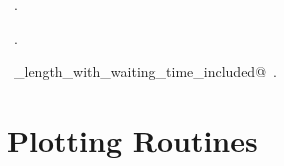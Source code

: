 \documentclass[11.5pt]{report}
\begin{document}
\begin{flushleft}
\begin{list}{}{}
\mbox{}\verb@@{\NWsep}
\end{list}
\vspace{-1.5ex}
\footnotesize
\begin{list}{}{\setlength{\itemsep}{-\parsep}\setlength{\itemindent}{-\leftmargin}}
\item \NWtxtMacroDefBy\ .
\item \NWtxtMacroRefIn\ .
\item \NWtxtIdentsDefed\nobreak\  \verb@tour_length_with_waiting_time_included@\nobreak\ .
\item{}
\end{list}
\vspace{4ex}
\end{flushleft}
\section{Plotting Routines}
\newchunk 
\end{document}
